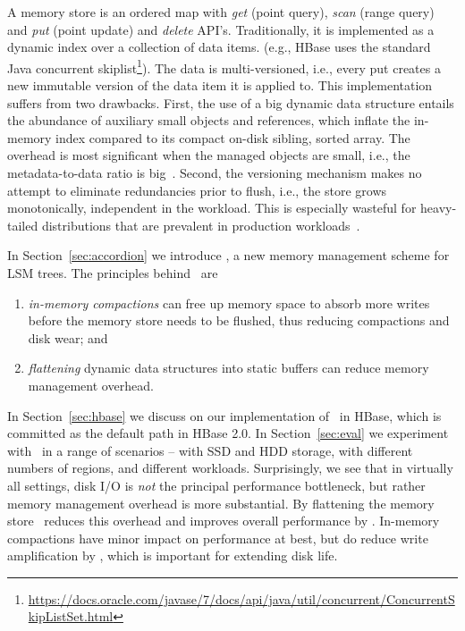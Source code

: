 A memory store is an ordered map with {\em get} (point query), {\em scan} (range query) and {\em put} 
(point update) and {\em delete} API's. Traditionally, it is implemented as a dynamic index over a collection of data items. 
(e.g., HBase uses the standard Java concurrent skiplist\footnote{\small{\url{https://docs.oracle.com/javase/7/docs/api/java/util/concurrent/ConcurrentSkipListSet.html}}}).
The data is multi-versioned, i.e., every put creates a new immutable version of the data item it is applied to. 
This implementation suffers from two drawbacks. First, the use of a big dynamic data structure entails 
the abundance of auxiliary small objects and references, which inflate the in-memory index compared 
to its compact on-disk sibling, sorted array. The overhead is most significant when the managed objects
are small, i.e., the metadata-to-data ratio is big~\cite{Wu2015}. Second, the versioning mechanism makes 
no attempt to eliminate redundancies prior to flush, i.e., the store grows monotonically, independent in the workload. 
This is especially wasteful for heavy-tailed distributions that are prevalent in production workloads~\cite{Devineni:2015}.


In Section~\ref{sec:accordion}
we introduce \sys, a new memory management scheme for LSM trees.
The principles behind \sys\ are 
\begin{enumerate}
\item \emph{in-memory compactions} can free up memory space to absorb more writes before the
memory store needs to be flushed, thus reducing compactions and disk wear; and
\item \emph{flattening} dynamic data structures into static buffers can reduce memory management overhead.
\end{enumerate}

In Section~\ref{sec:hbase} we  discuss on our implementation of  \sys\ in HBase, which is committed  as the default path in HBase 2.0. 
In Section~\ref{sec:eval} we experiment with \sys\ in a range of  scenarios -- with SSD and HDD storage, with different numbers
of regions, and different workloads. Surprisingly, we see that in virtually all settings, disk I/O is \emph{not} the principal performance bottleneck,
but rather memory management overhead is more substantial. By flattening the memory store \sys\ reduces this overhead and improves overall performance by . In-memory compactions have minor impact on performance at best, but do reduce 
write amplification by , which is important for extending disk life.





